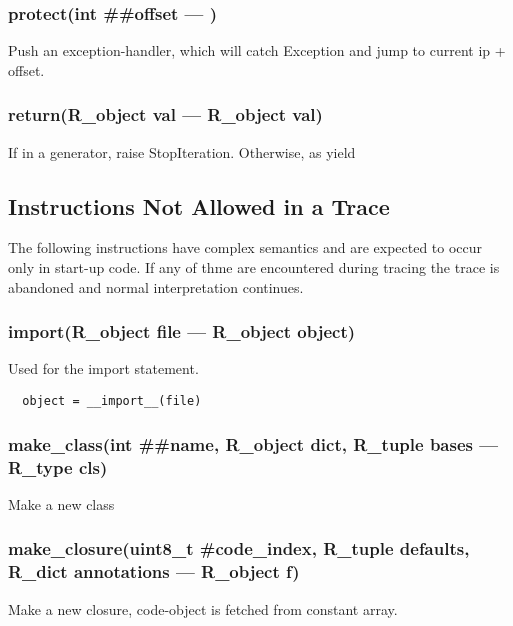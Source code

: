 \subsubsection{protect(int \#\#offset --- )}
\vspace{-1em}Push an exception-handler,  which will catch Exception and jump to current ip + offset. \vspace{-1em}
\subsubsection{return(R\_object val --- R\_object val)}
\vspace{-1em}If in a generator, raise StopIteration. Otherwise, as yield \vspace{-1em}
\subsection{Instructions Not Allowed in a Trace}

        The following instructions have complex semantics and are expected 
        to occur only in start-up code. If any of thme are encountered during 
        tracing the trace is abandoned and normal interpretation continues.
\subsubsection{import(R\_object file --- R\_object object)}
\vspace{-1em}Used for the import statement. \vspace{-1em}\begin{verbatim}
  object = __import__(file)
\end{verbatim}
\vspace{-1em}\vspace{-1em}
\subsubsection{make\_class(int \#\#name, R\_object dict, R\_tuple bases --- R\_type cls)}
\vspace{-1em}Make a new class \vspace{-1em}
\subsubsection{make\_closure(uint8\_t \#code\_index, R\_tuple defaults, R\_dict annotations --- R\_object f)}
\vspace{-1em}Make a new closure, code-object is fetched from constant array. \vspace{-1em}
